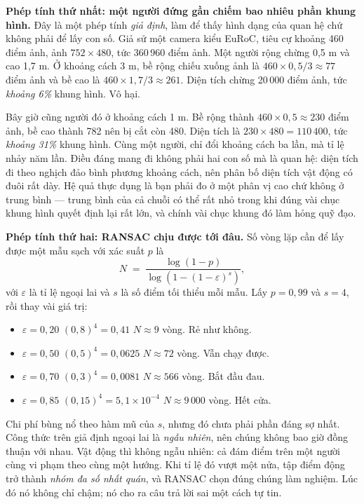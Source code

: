 \documentclass[../../deep_learning.tex]{subfiles}
\begin{document}
\textbf{Phép tính thứ nhất: một người đứng gần chiếm bao nhiêu phần khung hình.} Đây là một phép tính \emph{giả định}, làm để thấy hình dạng của quan hệ chứ không phải để lấy con số. Giả sử một camera kiểu EuRoC, tiêu cự khoảng 460 điểm ảnh, ảnh \(752 \times 480\), tức 360\,960 điểm ảnh. Một người rộng chừng 0,5 m và cao 1,7 m. Ở khoảng cách 3 m, bề rộng chiếu xuống ảnh là \(460 \times 0{,}5 / 3 \approx 77\) điểm ảnh và bề cao là \(460 \times 1{,}7/3 \approx 261\). Diện tích chừng 20\,000 điểm ảnh, tức \emph{khoảng 6\%} khung hình. Vô hại.

Bây giờ cũng người đó ở khoảng cách 1 m. Bề rộng thành \(460 \times 0{,}5 \approx 230\) điểm ảnh, bề cao thành 782 nên bị cắt còn 480. Diện tích là \(230 \times 480 = 110\,400\), tức \emph{khoảng 31\%} khung hình. Cùng một người, chỉ đổi khoảng cách ba lần, mà tỉ lệ nhảy năm lần. Điều đáng mang đi không phải hai con số mà là quan hệ: diện tích đi theo nghịch đảo bình phương khoảng cách, nên phân bố diện tích vật động có đuôi rất dày. Hệ quả thực dụng là bạn phải đo ở một phân vị cao chứ không ở trung bình --- trung bình của cả chuỗi có thể rất nhỏ trong khi đúng vài chục khung hình quyết định lại rất lớn, và chính vài chục khung đó làm hỏng quỹ đạo.

\textbf{Phép tính thứ hai: RANSAC chịu được tới đâu.} Số vòng lặp cần để lấy được một mẫu sạch với xác suất \(p\) là
\[
N \;=\; \frac{\log(1-p)}{\log\!\left(1-(1-\varepsilon)^{s}\right)},
\]
với \(\varepsilon\) là tỉ lệ ngoại lai và \(s\) là số điểm tối thiểu mỗi mẫu. Lấy \(p = 0{,}99\) và \(s = 4\), rồi thay vài giá trị:

\begin{itemize}
\item \(\varepsilon = 0{,}20\) \ra \((0{,}8)^4 = 0{,}41\) \ra \(N \approx 9\) vòng. Rẻ như không.
\item \(\varepsilon = 0{,}50\) \ra \((0{,}5)^4 = 0{,}0625\) \ra \(N \approx 72\) vòng. Vẫn chạy được.
\item \(\varepsilon = 0{,}70\) \ra \((0{,}3)^4 = 0{,}0081\) \ra \(N \approx 566\) vòng. Bắt đầu đau.
\item \(\varepsilon = 0{,}85\) \ra \((0{,}15)^4 = 5{,}1\times 10^{-4}\) \ra \(N \approx 9\,000\) vòng. Hết cửa.
\end{itemize}

Chi phí bùng nổ theo hàm mũ của \(s\), nhưng đó chưa phải phần đáng sợ nhất. Công thức trên giả định ngoại lai là \emph{ngẫu nhiên}, nên chúng không bao giờ đồng thuận với nhau. Vật động thì không ngẫu nhiên: cả đám điểm trên một người cùng vi phạm theo cùng một hướng. Khi tỉ lệ đó vượt một nửa, tập điểm động trở thành \emph{nhóm đa số nhất quán}, và RANSAC chọn đúng chúng làm nghiệm. Lúc đó nó không chỉ chậm; nó cho ra câu trả lời sai một cách tự tin.
\end{document}
